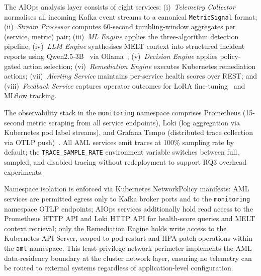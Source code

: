 \documentclass[a4paper,anonymous,UKenglish]{lipics-v2021}
\begin{document}
The AIOps analysis layer consists of eight services:
(i)~\textit{Telemetry Collector} normalises all incoming Kafka event streams to
a canonical \texttt{MetricSignal} format; (ii)~\textit{Stream Processor}
computes 60-second tumbling-window aggregates per (service, metric) pair;
(iii)~\textit{ML Engine} applies the three-algorithm detection pipeline;
(iv)~\textit{LLM Engine} synthesises MELT context into structured incident
reports using Qwen2.5-3B~\cite{qwen2024} via Ollama~\cite{ollama2023};
(v)~\textit{Decision Engine} applies policy-gated action selection;
(vi)~\textit{Remediation Engine} executes Kubernetes remediation actions;
(vii)~\textit{Alerting Service} maintains per-service health scores over REST;
and (viii)~\textit{Feedback Service} captures operator outcomes for LoRA
fine-tuning~\cite{hu2022lora} and MLflow tracking.

The observability stack in the \texttt{monitoring} namespace comprises
Prometheus (15-second metric scraping from all service endpoints), Loki (log
aggregation via Kubernetes pod label streams), and Grafana Tempo (distributed
trace collection via OTLP push)~\cite{prometheus2015, loki2019, tempo2022}.
All AML services emit traces at 100\% sampling rate by default; the
\texttt{TRACE\_SAMPLE\_RATE} environment variable switches between full,
sampled, and disabled tracing without redeployment to support RQ3 overhead
experiments.

Namespace isolation is enforced via Kubernetes NetworkPolicy manifests: AML
services are permitted egress only to Kafka broker ports and to the
\texttt{monitoring} namespace OTLP endpoints; AIOps services additionally hold
read access to the Prometheus HTTP API and Loki HTTP API for health-score
queries and MELT context retrieval; only the Remediation Engine holds write
access to the Kubernetes API Server, scoped to pod-restart and HPA-patch
operations within the \texttt{aml} namespace. This least-privilege network
perimeter implements the AML data-residency boundary at the cluster network
layer, ensuring no telemetry can be routed to external systems regardless of
application-level configuration.
\end{document}
